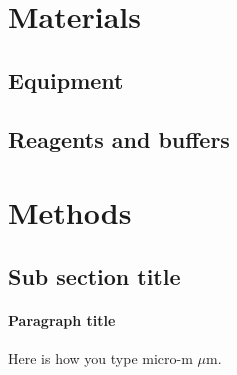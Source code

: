 \section{Materials}
\subsection{Equipment}

\subsection{Reagents and buffers}



\section{Methods}
\subsection{Sub section title}
\paragraph{Paragraph title}
Here is how you type micro-m $\mu$m.


